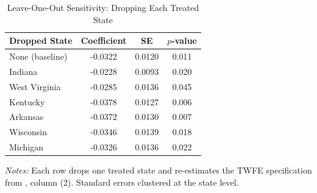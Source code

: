 \begin{table}[H]
\centering
\caption{Leave-One-Out Sensitivity: Dropping Each Treated State}
\label{tab:loo}
\begin{threeparttable}
\begin{tabular}{lccc}
\toprule
Dropped State & Coefficient & SE & $p$-value \\
\midrule
None (baseline) & -0.0322 & 0.0120 & 0.011 \\
Indiana & -0.0228 & 0.0093 & 0.020 \\
West Virginia & -0.0285 & 0.0136 & 0.045 \\
Kentucky & -0.0378 & 0.0127 & 0.006 \\
Arkansas & -0.0372 & 0.0130 & 0.007 \\
Wisconsin & -0.0346 & 0.0139 & 0.018 \\
Michigan & -0.0326 & 0.0136 & 0.022 \\
\bottomrule
\end{tabular}
\begin{tablenotes}[flushleft]
\small
\item \textit{Notes:} Each row drops one treated state and re-estimates the TWFE specification from , column (2). Standard errors clustered at the state level.
\end{tablenotes}
\end{threeparttable}
\end{table}
